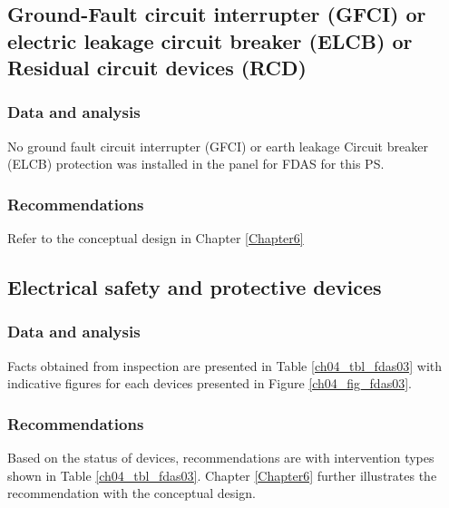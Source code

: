 \subsection{Ground-Fault circuit interrupter (GFCI) or electric leakage circuit breaker (ELCB) or Residual circuit devices (RCD)} \label{ch04fdas03}
\subsubsection{Data and analysis}
No ground fault circuit interrupter (GFCI) or earth leakage Circuit breaker (ELCB) protection was installed in the panel for FDAS for this PS.


\subsubsection{Recommendations}
Refer to the conceptual design in Chapter \ref{Chapter6}
\subsection{Electrical safety and protective devices} \label{ch04fdas04}
\subsubsection{Data and analysis}
Facts obtained from inspection are presented in Table \ref{ch04_tbl_fdas03} with indicative figures for each devices presented in Figure \ref{ch04_fig_fdas03}.






\subsubsection{Recommendations}
Based on the status of devices, recommendations are with intervention types shown in Table \ref{ch04_tbl_fdas03}. Chapter \ref{Chapter6} further illustrates the recommendation with the conceptual design.







